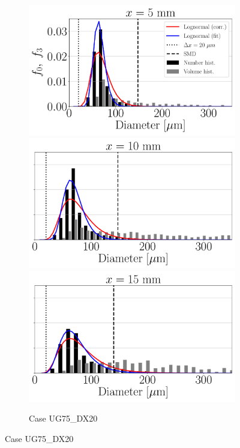 \begin{figure}[ht]
\begin{subfigure}[b]{1.1\textwidth}
	\flushleft
   \includegraphics[scale=0.225]{./part2_developments/figures_ch5_resolved_JICF/SPRAY_characterization/histograms_size_volume/UG75_DX20_x05_histograms}
   \includegraphics[scale=0.225]{./part2_developments/figures_ch5_resolved_JICF/SPRAY_characterization/histograms_size_volume/UG75_DX20_x10_histograms}
   \includegraphics[scale=0.225]{./part2_developments/figures_ch5_resolved_JICF/SPRAY_characterization/histograms_size_volume/UG75_DX20_x15_histograms}
	\caption{Case UG75\_DX20}
\end{subfigure}



\end{figure}
